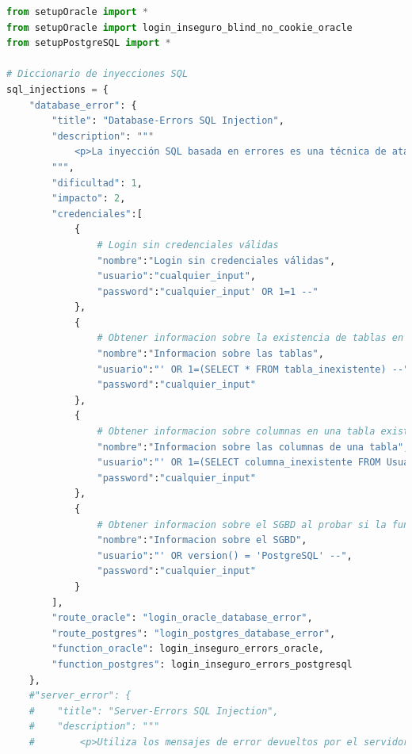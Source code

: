 \documentclass[a4paper,12pt]{article}
\begin{document}
\begin{lstlisting}[language=Python]
    from setupOracle import *
from setupOracle import login_inseguro_blind_no_cookie_oracle
from setupPostgreSQL import *

# Diccionario de inyecciones SQL
sql_injections = {
    "database_error": {
        "title": "Database-Errors SQL Injection",
        "description": """
            <p>La inyección SQL basada en errores es una técnica de ataque en la que un atacante manipula consultas SQL para provocar que la base de datos genere mensajes de error detallados. Estos mensajes pueden revelar información sensible sobre la estructura y el contenido de la base de datos, facilitando al atacante la planificación de ataques más sofisticados. Para mitigar este riesgo, es esencial validar y sanear todas las entradas de usuario, utilizar consultas parametrizadas y configurar la aplicación para que no revele detalles internos en mensajes de error.</p>
        """,
        "dificultad": 1,
        "impacto": 2,
        "credenciales":[
            {
                # Login sin credenciales válidas
                "nombre":"Login sin credenciales válidas",
                "usuario":"cualquier_input",
                "password":"cualquier_input' OR 1=1 --"
            },
            {
                # Obtener informacion sobre la existencia de tablas en la BD
                "nombre":"Informacion sobre las tablas",
                "usuario":"' OR 1=(SELECT * FROM tabla_inexistente) --",
                "password":"cualquier_input"
            },
            {
                # Obtener informacion sobre columnas en una tabla existente
                "nombre":"Informacion sobre las columnas de una tabla",
                "usuario":"' OR 1=(SELECT columna_inexistente FROM Usuarios) --",
                "password":"cualquier_input"
            },
            {
                # Obtener informacion sobre el SGBD al probar si la funcion version() es valida en el SGBD en el que se esta trabajando (funciona en PostgreSQL y MySQL)
                "nombre":"Informacion sobre el SGBD",
                "usuario":"' OR version() = 'PostgreSQL' --",
                "password":"cualquier_input"
            }
        ],
        "route_oracle": "login_oracle_database_error",
        "route_postgres": "login_postgres_database_error",
        "function_oracle": login_inseguro_errors_oracle,
        "function_postgres": login_inseguro_errors_postgresql
    },
    #"server_error": {
    #    "title": "Server-Errors SQL Injection",
    #    "description": """
    #        <p>Utiliza los mensajes de error devueltos por el servidor para obtener información sobre la base de datos

\end{lstlisting}
\end{document}
